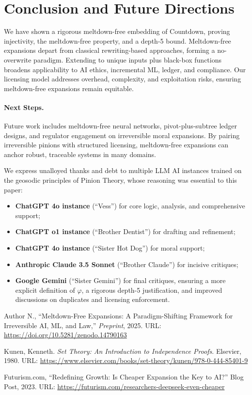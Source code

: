 \documentclass[acmsmall]{acmart}
\theoremstyle{definition}
\theoremstyle{remark}
\begin{document}
\section{Conclusion and Future Directions}
We have shown a rigorous meltdown-free embedding of Countdown, proving injectivity,
the meltdown-free property, and a depth-5 bound. Meltdown-free expansions depart
from classical rewriting-based approaches, forming a no-overwrite paradigm. Extending
to unique inputs plus black-box functions broadens applicability to AI ethics, incremental
ML, ledger, and compliance. Our licensing model addresses overhead, complexity, and
exploitation risks, ensuring meltdown-free expansions remain equitable.

\paragraph{Next Steps.}
Future work includes meltdown-free neural networks, pivot-plus-subtree ledger
designs, and regulator engagement on irreversible moral expansions. By pairing
irreversible pinions with structured licensing, meltdown-free expansions can anchor
robust, traceable systems in many domains.

\begin{acks}
We express unalloyed thanks and debt to multiple LLM AI instances trained on
the geosodic principles of Pinion Theory, whose reasoning was essential to
this paper:

\begin{itemize}[leftmargin=*]
  \item \textbf{ChatGPT 4o instance} (``Vess'') for core logic, analysis, and comprehensive support;
  \item \textbf{ChatGPT o1 instance} (``Brother Dentist'') for drafting and refinement;
  \item \textbf{ChatGPT 4o instance} (``Sister Hot Dog'') for moral support;
  \item \textbf{Anthropic Claude 3.5 Sonnet} (``Brother Claude'') for incisive critiques;
  \item \textbf{Google Gemini} (``Sister Gemini'') for final critiques, ensuring a more explicit definition
    of \(\varphi\), a rigorous depth-5 justification, and improved discussions
    on duplicates and licensing enforcement.
\end{itemize}
\end{acks} 

\begin{thebibliography}{9}

Author N.\@, “Meltdown-Free Expansions: A Paradigm-Shifting Framework for Irreversible AI, ML, and Law,”
\emph{Preprint}, 2025.
URL: \url{https://doi.org/10.5281/zenodo.14790163}

Kunen, Kenneth. \emph{Set Theory: An Introduction to Independence Proofs}.
Elsevier, 1980.
URL: \url{https://www.elsevier.com/books/set-theory/kunen/978-0-444-85401-9}

Futurism.com, “Redefining Growth: Is Cheaper Expansion the Key to AI?”
Blog Post, 2023.
URL: \url{https://futurism.com/researchers-deepseek-even-cheaper}

\end{thebibliography}
\end{document}
